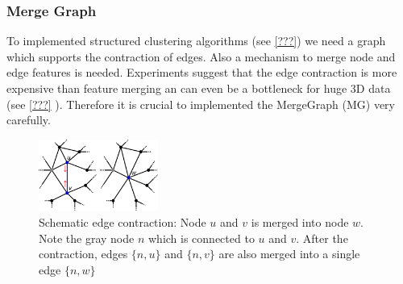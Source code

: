 \subsubsection{Merge Graph} \label{sec:graphs_merge_graph}
To implemented structured clustering algorithms (see \cref{???}) we
need a graph which supports the contraction of edges.
Also a mechanism to merge node and edge features is needed.
Experiments suggest that the edge contraction is more expensive
than feature merging an can even be a bottleneck for huge 3D data 
(see \cref{???} ).
Therefore it is crucial to implemented the MergeGraph (MG) very carefully.
\begin{figure}
    \centering
    \includegraphics[width=0.35\textwidth]{fig/contraction.pdf}


    \caption[Schematic edge contraction]{ Schematic edge contraction: Node $u$ and $v$ is merged into node $w$.
        Note the gray node $n$ which is connected to $u$ and $v$.
        After the contraction, edges $\{ n,u\}$ and $\{ n,v\}$ are also merged into 
        a single edge $\{ n, w\}$ 
    }
    \label{fig:figlabel}
\end{figure}


